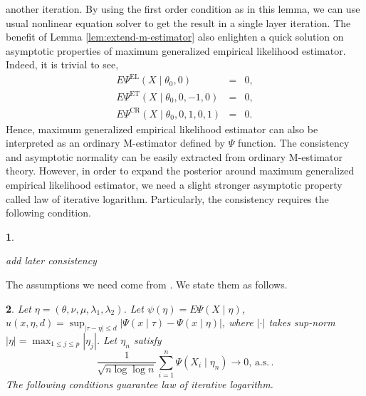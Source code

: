 \documentclass[oneside,english]{amsbook}
\numberwithin{section}{chapter}
\numberwithin{equation}{section}
\numberwithin{figure}{section}
\theoremstyle{plain}
\theoremstyle{plain}
\newtheorem{assumption}{\protect\assumptionname}
\theoremstyle{definition}
\theoremstyle{plain}
\theoremstyle{plain}
\theoremstyle{remark}
\theoremstyle{definition}
\theoremstyle{definition}
\newcommand{\ascv}{\,\mathrm{a.s.}\,}
\providecommand{\assumptionname}{Assumption}
\begin{document}
another iteration. By using the first order condition as in this lemma,
we can use usual nonlinear equation solver to get the result in a
single layer iteration. The benefit of Lemma \ref{lem:extend-m-estimator}
also enlighten a quick solution on asymptotic properties of maximum
generalized empirical likelihood estimator. Indeed, it is trivial
to see, 
\begin{eqnarray*}
E\Psi^{\mathrm{EL}}\left(X\mid\theta_{0},0\right) & = & 0,\\
E\Psi^{\mathrm{ET}}\left(X\mid\theta_{0},0,-1,0\right) & = & 0,\\
E\Psi^{\mathrm{CR}}\left(X\mid\theta_{0},0,1,0,1\right) & = & 0.
\end{eqnarray*}
Hence, maximum generalized empirical likelihood estimator can also
be interpreted as an ordinary M-estimator defined by $\Psi$ function.
The consistency and asymptotic normality can be easily extracted from
ordinary M-estimator theory. However, in order to expand the posterior
around maximum generalized empirical likelihood estimator, we need
a slight stronger asymptotic property called law of iterative logarithm.
Particularly, the consistency requires the following condition.
\begin{assumption}
\label{assu:consistency-m-est}%

add later consistency
\end{assumption}
The assumptions we need come from \citet{he1995law}. We state them
as follows.
\begin{assumption}
\label{assu:lil-m-est}Let $\eta=\left(\theta,\nu,\mu,\lambda_{1},\lambda_{2}\right)$.
Let $\psi\left(\eta\right)=E\Psi\left(X\mid\eta\right)$, $u\left(x,\eta,d\right)=\sup_{\left|\tau-\eta\right|\le d}\left|\Psi\left(x\mid\tau\right)-\Psi\left(x\mid\eta\right)\right|$,
where $\left|\cdot\right|$ takes sup-norm $\left|\eta\right|=\max_{1\le j\le p}\left|\eta_{j}\right|$.
Let $\eta_{n}$ satisfy 
\[
\frac{1}{\sqrt{n\log\log n}}\sum_{i=1}^{n}\Psi\left(X_{i}\mid\eta_{n}\right)\rightarrow0,\ascv.
\]
 The following conditions guarantee law of iterative logarithm.\end{assumption}
\end{document}
